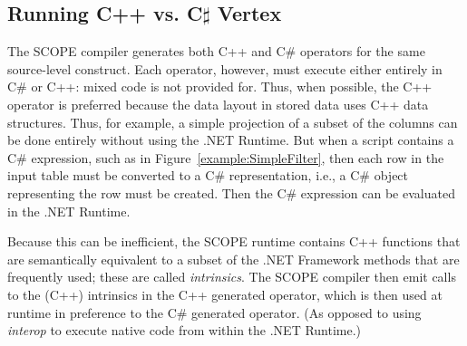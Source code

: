 \subsection{Running C++ vs. C$\sharp$ Vertex}
The SCOPE compiler generates both C++ and C\# operators for the same source-level construct.
Each operator, however, must execute either entirely in C\# or C++: mixed code is not provided for.
Thus, when possible, the C++ operator is preferred because the data layout in stored data uses C++ data structures.
Thus, for example, a simple projection of a subset of the columns can be done entirely
without using the .NET Runtime.
But when a script contains a C\# expression, such as in Figure~\ref{example:SimpleFilter}, then
each row in the input table must be converted to a C\# representation, i.e., a C\# object representing
the row must be created.
Then the C\# expression can be evaluated in the .NET Runtime.

Because this can be inefficient, the SCOPE runtime contains C++ functions that are semantically
equivalent to a subset of the .NET Framework methods that are frequently used; these are called
{\it intrinsics}.
The SCOPE compiler then emit calls to the (C++) intrinsics in the C++ generated operator, which is
then used at runtime in preference to the C\# generated operator.
(As opposed to using {\it interop} to execute native code from within the .NET Runtime.)


